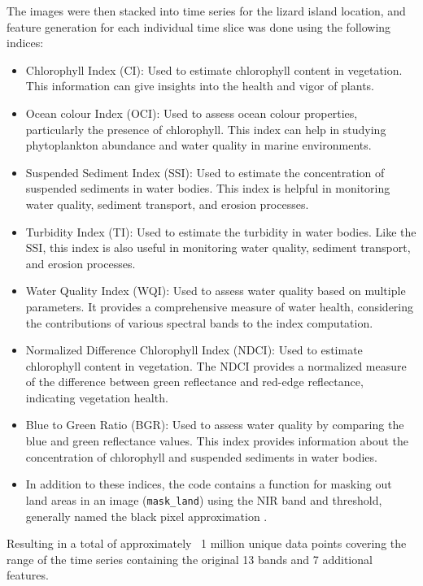 \documentclass[journal,article,submit,pdftex,moreauthors]{Definitions/mdpi}
\begin{document}
The images were then stacked into time series for the lizard island location, and feature generation for each individual time slice was done using the following indices:
 \begin{itemize}
	\item Chlorophyll Index (CI): Used to estimate chlorophyll content in vegetation. This information can give insights into the health and vigor of plants.
	
	\item Ocean colour Index (OCI): Used to assess ocean colour properties, particularly the presence of chlorophyll. This index can help in studying phytoplankton abundance and water quality in marine environments.
	
	\item Suspended Sediment Index (SSI): Used to estimate the concentration of suspended sediments in water bodies. This index is helpful in monitoring water quality, sediment transport, and erosion processes.
	
	\item Turbidity Index (TI): Used to estimate the turbidity in water bodies. Like the SSI, this index is also useful in monitoring water quality, sediment transport, and erosion processes.
	
	\item Water Quality Index (WQI): Used to assess water quality based on multiple parameters. It provides a comprehensive measure of water health, considering the contributions of various spectral bands to the index computation.
	
	\item Normalized Difference Chlorophyll Index (NDCI): Used to estimate chlorophyll content in vegetation. The NDCI provides a normalized measure of the difference between green reflectance and red-edge reflectance, indicating vegetation health.
	
	\item Blue to Green Ratio (BGR): Used to assess water quality by comparing the blue and green reflectance values. This index provides information about the concentration of chlorophyll and suspended sediments in water bodies.
	
	\item In addition to these indices, the code contains a function for masking out land areas in an image (\texttt{mask\_land}) using the NIR band and threshold, generally named the black pixel approximation \cite{siegel2000atmospheric}.
\end{itemize}
Resulting in a total of approximately ~1 million unique data points covering the range of the time series containing the original 13 bands and 7 additional features.
\end{document}
